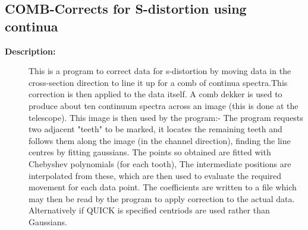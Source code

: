 \subsection{COMB-\label{COMB}Corrects for S-distortion using continua}
\begin{description}

\item [\textbf{Description:}]
   This is a program to correct data for s-distortion by moving data in
  the cross-section direction to line it up for a comb of continua
  spectra.This correction is then applied to the data itself. A comb
  dekker is used to produce about ten continuum spectra across an image
  (this is done at the telescope). This image is then used by the
  program:- The program requests two adjacent "teeth" to be marked, it
  locates the remaining teeth and follows them along the image (in the
  channel direction), finding the line centres by fitting gaussians. The
  points so obtained are fitted with Chebyshev polynomials (for each
  tooth), The intermediate positions are interpolated from these, which
  are then used to evaluate the required movement for each data point.
  The coefficients are written to a file which may then be read by the
  program to apply correction to the actual data.
  Alternatively if QUICK is specified centriods are used rather than
  Gaussians.


\end{description}
